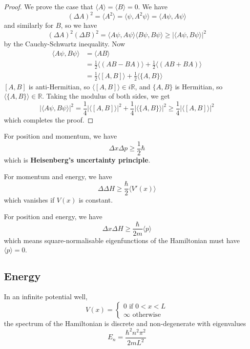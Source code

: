 \begin{proof}
	We prove the case that $\langle A \rangle = \langle B \rangle = 0$. We have
	\[
		{(\Delta A)}^2 = \langle A^2 \rangle = \langle \psi, A^2 \psi \rangle = \langle A \psi, A \psi \rangle
	\]
	and similarly for $B$, so we have
	\[
		{(\Delta A)}^2 {(\Delta B)}^2 = \langle A \psi, A \psi \rangle \langle B \psi, B \psi \rangle \ge |\langle A \psi, B \psi \rangle|^2
	\]
	by the Cauchy-Schwartz inequality. Now
	\[
		\begin{aligned}
			\langle A \psi, B \psi \rangle & = \langle AB \rangle \\
			& = \frac{1}{2} \langle (AB - BA) \rangle + \frac{1}{2} \langle (AB + BA) \rangle \\
			& = \frac{1}{2} \langle [A, B] \rangle + \frac{1}{2} \langle \{ A, B \} \rangle
		\end{aligned}
	\]
	$[A, B]$ is anti-Hermitian, so $\langle [A, B] \rangle \in i \mathbb{R}$, and $\{ A, B \}$ is Hermitian, so $\langle \{ A, B \} \rangle \in \mathbb{R}$. Taking the modulus of both sides, we get
	\[
		|\langle A \psi, B \psi \rangle|^2 = \frac{1}{4} |\langle [A, B] \rangle|^2 + \frac{1}{4} |\langle \{ A, B \} \rangle|^2 \ge \frac{1}{4} |\langle [A, B] \rangle|^2
	\]
	which completes the proof.
\end{proof}

\begin{example}
	For position and momentum, we have
	\[
		\Delta x \Delta p \ge \frac{1}{2} \hbar
	\]
	which is \textbf{Heisenberg's uncertainty principle}.
\end{example}

\begin{example}
	For momentum and energy, we have
	\[
		\Delta \Delta H \ge \frac{\hbar}{2} \langle V'(x) \rangle
	\]
	which vanishes if $V(x)$ is constant.
\end{example}

\begin{example}
	For position and energy, we have
	\[
		\Delta x \Delta H \ge \frac{\hbar}{2m} \langle p \rangle
	\]
	which means square-normalisable eigenfunctions of the Hamiltonian must have $\langle p \rangle = 0$.
\end{example}

\subsection{Energy}

\begin{example}
	In an infinite potential well,
	\[
		V(x) = \begin{cases}
			0 \text{ if } 0 < x < L \\
			\infty \text{ otherwise}
		\end{cases}
	\]
	the spectrum of the Hamiltonian is discrete and non-degenerate with eigenvalues
	\[
		E_n = \frac{\hbar^2 n^2 \pi^2}{2mL^2}
	\]
\end{example}

